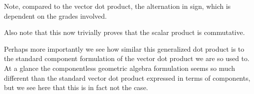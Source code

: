\documentclass{article}      %
\begin{document}
Note, compared to the vector dot product, the alternation in sign, which is
dependent on the grades involved.

Also note that this now trivially proves that the scalar product is commutative.

Perhaps more importantly we see how similar this generalized dot product is to the
standard component formulation of the vector dot product we are so used to.
At a glance the componentless geometric algebra formulation seems
so much different than the standard vector dot product expressed in terms of components, but
we see here that this is in fact not the case.
\end{document}
